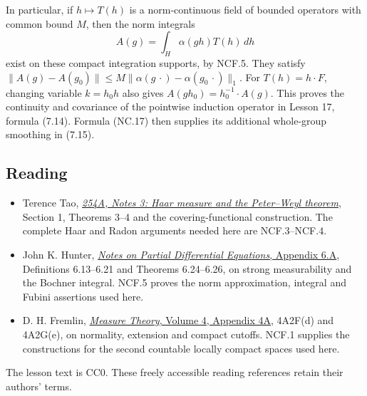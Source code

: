 \documentclass[
  11pt,
]{article}
\providecommand{\tightlist}{%
  \setlength{\itemsep}{0pt}\setlength{\parskip}{0pt}}
\begin{document}
In particular, if \(h\mapsto T(h)\) is a norm-continuous field of
bounded operators with common bound \(M\), then the norm integrals \[
 A(g)=\int_H\alpha(gh)T(h)\,dh
\] exist on these compact integration supports, by NCF.5. They satisfy
\(\|A(g)-A(g_0)\|\leq M\|\alpha(g\,\cdot)-\alpha(g_0\,\cdot)\|_1\). For
\(T(h)=h\cdot F\), changing variable \(k=h_0h\) also gives
\(A(gh_0)=h_0^{-1}\cdot A(g)\). This proves the continuity and
covariance of the pointwise induction operator in Lesson 17, formula
(7.14). Formula (NC.17) then supplies its additional whole-group
smoothing in (7.15).

\subsection{Reading}\label{reading}

\begin{itemize}
\tightlist
\item
  Terence Tao,
  \href{https://terrytao.wordpress.com/2011/09/27/254a-notes-3-haar-measure-and-the-peter-weyl-theorem/}{\emph{254A,
  Notes 3: Haar measure and the Peter--Weyl theorem}}, Section 1,
  Theorems 3--4 and the covering-functional construction. The complete
  Haar and Radon arguments needed here are NCF.3--NCF.4.
\item
  John K. Hunter,
  \href{https://www.math.ucdavis.edu/~hunter/pdes/ch6A.pdf}{\emph{Notes
  on Partial Differential Equations}, Appendix 6.A}, Definitions
  6.13--6.21 and Theorems 6.24--6.26, on strong measurability and the
  Bochner integral. NCF.5 proves the norm approximation, integral and
  Fubini assertions used here.
\item
  D. H. Fremlin,
  \href{https://www1.essex.ac.uk/maths/people/fremlin/chap4a.pdf}{\emph{Measure
  Theory}, Volume 4, Appendix 4A}, 4A2F(d) and 4A2G(e), on normality,
  extension and compact cutoffs. NCF.1 supplies the constructions for
  the second countable locally compact spaces used here.
\end{itemize}

The lesson text is CC0. These freely accessible reading references
retain their authors' terms.
\end{document}
